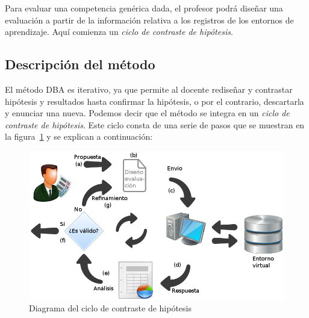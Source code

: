 Para evaluar una competencia genérica dada, el profesor podrá diseñar una evaluación a partir de la información relativa a los registros de los entornos de aprendizaje. Aquí comienza un \emph{ciclo de contraste de hipótesis}. 





\subsection{Descripción del método}

El método DBA es iterativo, ya que permite al docente rediseñar y contrastar hipótesis y resultados hasta confirmar la hipótesis, o por el contrario, descartarla y enunciar una nueva. Podemos decir que el método se integra en un \emph{ciclo de contraste de hipótesis}. Este ciclo consta de una serie de pasos que se muestran en la figura~\ref{fig:CCHDiagram} y se explican a continuación:

\begin{figure}
  \begin{center}
    \includegraphics[scale=0.45]{CCHDiagram.png}
  \end{center}
  \caption{Diagrama del ciclo de contraste de hipótesis}
  \label{fig:CCHDiagram}
\end{figure}


